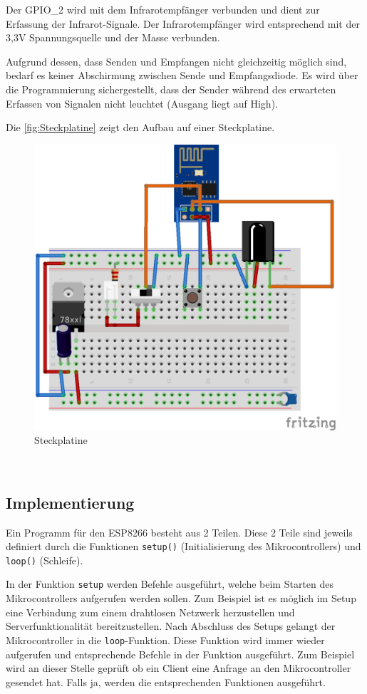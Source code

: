 Der \acs{GPIO}\_2 wird mit dem Infrarotempfänger verbunden und dient zur Erfassung der Infrarot-Signale.
Der Infrarotempfänger wird entsprechend mit der 3,3V Spannungsquelle und der Masse verbunden.

Aufgrund dessen, dass Senden und Empfangen nicht gleichzeitig möglich sind, bedarf es keiner Abschirmung zwischen Sende und Empfangsdiode. Es wird über die Programmierung sichergestellt, dass der Sender während des erwarteten Erfassen von Signalen nicht leuchtet (Ausgang liegt auf High).

Die \autoref{fig:Steckplatine} zeigt den Aufbau auf einer Steckplatine.

\begin{figure}[h]
	\centering
	\includegraphics[scale=1]{Abbildungen/ESP8266_Steckplatine}
	\caption{Steckplatine}
	\label{fig:Steckplatine}
\end{figure}~\\

\subsection{Implementierung}
Ein Programm für den ESP8266 besteht aus 2 Teilen.
Diese 2 Teile sind jeweils definiert durch die Funktionen \texttt{setup()} (Initialisierung des Mikrocontrollers) und \texttt{loop()} (Schleife).

In der Funktion \texttt{setup} werden Befehle ausgeführt, welche beim Starten des Mikrocontrollers aufgerufen werden sollen.
Zum Beispiel ist es möglich im Setup eine Verbindung zum einem drahtlosen Netzwerk herzustellen und Serverfunktionalität bereitzustellen.
Nach Abschluss des Setups gelangt der Mikrocontroller in die \texttt{loop}-Funktion.
Diese Funktion wird immer wieder aufgerufen und entsprechende Befehle in der Funktion ausgeführt.
Zum Beispiel wird an dieser Stelle geprüft ob ein Client eine Anfrage an den Mikrocontroller gesendet hat.
Falls ja, werden die entsprechenden Funktionen ausgeführt.

